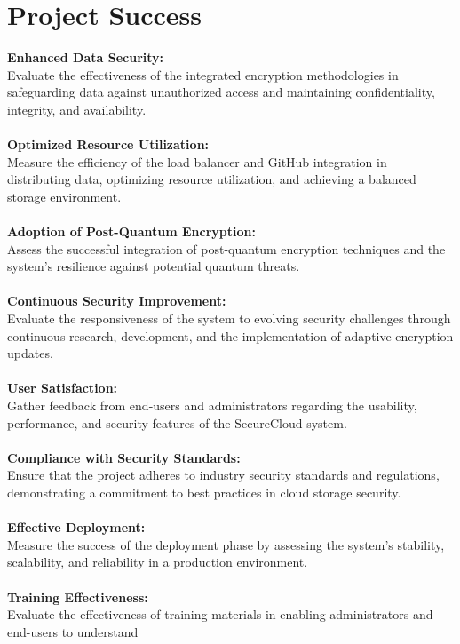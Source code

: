 \section{Project Success}
\textbf{Enhanced Data Security:}\\
Evaluate the effectiveness of the integrated encryption methodologies in safeguarding data against
unauthorized access and maintaining confidentiality, integrity, and availability. 
\\
\\
\textbf{Optimized Resource Utilization: }\\
Measure the efficiency of the load balancer and GitHub integration in distributing data, optimizing
resource utilization, and achieving a balanced storage environment.
\\
\\
\textbf{Adoption of Post-Quantum Encryption:  }\\
Assess the successful integration of post-quantum encryption techniques and the system's resilience
against potential quantum threats. 
\\
\\
\textbf{Continuous Security Improvement: }\\
Evaluate the responsiveness of the system to evolving security challenges through continuous
research, development, and the implementation of adaptive encryption updates. 
\\
\\
\textbf{User Satisfaction:}\\
Gather feedback from end-users and administrators regarding the usability, performance, and security
features of the SecureCloud system. 
\\
\\
\textbf{Compliance with Security Standards: }\\
Ensure that the project adheres to industry security standards and regulations, demonstrating a
commitment to best practices in cloud storage security.
\\
\\
\textbf{Effective Deployment:}\\
Measure the success of the deployment phase by assessing the system's stability, scalability, and
reliability in a production environment.
\\
\\\textbf{Training Effectiveness:}\\
Evaluate the effectiveness of training materials in enabling administrators and end-users to understand
